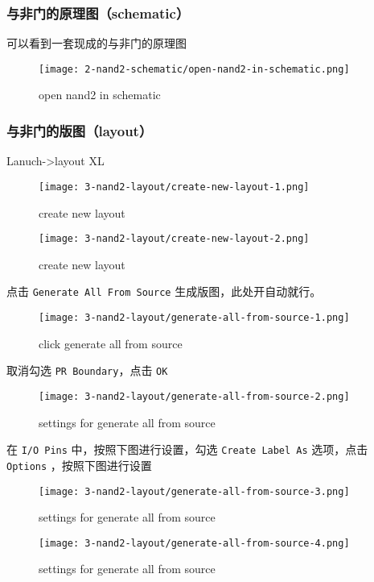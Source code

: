 \documentclass{theme-2614084}
\begin{document}
\subsubsection{与非门的原理图（schematic）}

可以看到一套现成的与非门的原理图

\begin{figure}[H]
  \centering\texttt{[image: 2-nand2-schematic/open-nand2-in-schematic.png]}
  \caption{open nand2 in schematic}
\end{figure}

\subsubsection{与非门的版图（layout）}

Lanuch->layout XL

\begin{figure}[H]
  \centering\texttt{[image: 3-nand2-layout/create-new-layout-1.png]}
  \caption{create new layout}
\end{figure}

\begin{figure}[H]
  \centering\texttt{[image: 3-nand2-layout/create-new-layout-2.png]}
  \caption{create new layout}
\end{figure}

点击 \texttt{Generate All From Source} 生成版图，此处开自动就行。

\begin{figure}[H]
  \centering\texttt{[image: 3-nand2-layout/generate-all-from-source-1.png]}
  \caption{click generate all from source}
\end{figure}

取消勾选 \texttt{PR Boundary}，点击 \texttt{OK}

\begin{figure}[H]
  \centering\texttt{[image: 3-nand2-layout/generate-all-from-source-2.png]}
  \caption{settings for generate all from source}
\end{figure}

在 \texttt{I/O Pins} 中，按照下图进行设置，勾选 \texttt{Create Label As} 选项，点击 \texttt{Options} ，按照下图进行设置

\begin{figure}[htbp]
  \centering\begin{minipage}[t]{0.48\textwidth}
      \centering\texttt{[image: 3-nand2-layout/generate-all-from-source-3.png]}
      \caption{settings for generate all from source}
  \end{minipage}
  \centering\begin{minipage}[t]{0.48\textwidth}
      \centering\texttt{[image: 3-nand2-layout/generate-all-from-source-4.png]}
      \caption{settings for generate all from source}
  \end{minipage}
\end{figure}
\end{document}
